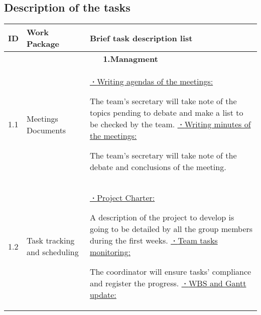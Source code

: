 \subsection{Description of the tasks}
\begin{longtable}{ | p{1.3cm} | p{3cm} | p{11cm} |}
\hline
\textbf{ID} & \textbf{Work Package} & \textbf{Brief task description list} \\ 
\hline
\multicolumn{3}{|c|}{\textbf{1.Managment}} \\ \hline
1.1 & Meetings Documents & 

\underline{\textbf{·}Writing agendas of the meetings:}   

The team’s secretary will take note of the topics pending to debate and make a list to be checked by the team. \newline
\underline{\textbf{·}Writing minutes of the meetings:} 

The team’s secretary will take note of the debate and conclusions of the meeting.\\ \hline

1.2 & Task tracking and scheduling & 

\underline{\textbf{·}Project Charter:}

A description of the project to develop is going to be detailed by all the group members during the first weeks. \newline
\underline{\textbf{·}Team tasks monitoring:}

The coordinator will ensure tasks' compliance and register the progress.\newline
\underline{\textbf{·}WBS and Gantt update:}


\end{longtable}
